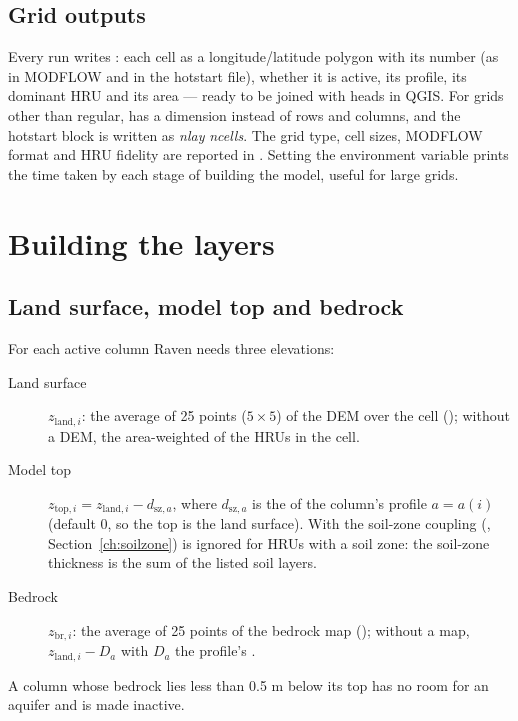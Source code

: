\subsection{Grid outputs}
Every run writes : each cell as a longitude/latitude polygon with its number (as in MODFLOW and in
the hotstart file), whether it is active, its profile, its dominant HRU and its area --- ready to be joined with heads in
QGIS. For grids other than regular,  has a  dimension instead of rows and columns, and the hotstart
block is written as  \emph{nlay}  \emph{ncells}. The grid type, cell sizes, MODFLOW format and HRU
fidelity are reported in . Setting the environment variable  prints the time
taken by each stage of building the model, useful for large grids.

\section{Building the layers}\label{ch:layers}
\subsection{Land surface, model top and bedrock}
For each active column Raven needs three elevations:
\begin{description}
\item[Land surface] $z_{\mathrm{land},i}$: the average of 25 points ($5\times5$) of the DEM over the cell
(); without a DEM, the area-weighted  of the HRUs in the cell.
\item[Model top] $z_{\mathrm{top},i}=z_{\mathrm{land},i}-d_{\mathrm{sz},a}$, where $d_{\mathrm{sz},a}$ is the
 of the column's profile $a=a(i)$ (default 0, so the top is the land surface). With the soil-zone
coupling (, Section~\ref{ch:soilzone})  is ignored for HRUs with a soil zone: the soil-zone thickness
is the sum of the listed soil layers.
\item[Bedrock] $z_{\mathrm{br},i}$: the average of 25 points of the bedrock map (); without a map,
$z_{\mathrm{land},i}-D_a$ with $D_a$ the profile's .
\end{description}
A column whose bedrock lies less than 0.5 m below its top has no room for an aquifer and is made inactive.

